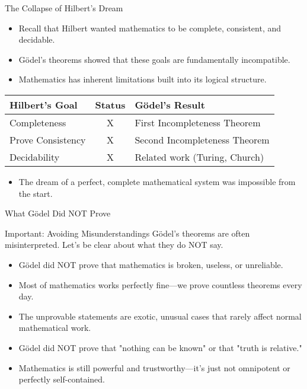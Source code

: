 \documentclass[aspectratio=169]{beamer}
\begin{document}
\begin{frame}{The Collapse of Hilbert's Dream}

\begin{itemize}
    \item Recall that Hilbert wanted mathematics to be complete, consistent, and decidable.
    \item Gödel's theorems showed that these goals are fundamentally incompatible.
    \item Mathematics has inherent limitations built into its logical structure.
\end{itemize}

\begin{table}
\centering
\begin{tabular}{|l|c|l|}
\hline
\textbf{Hilbert's Goal} & \textbf{Status} & \textbf{Gödel's Result} \\
\hline
Completeness & X & First Incompleteness Theorem \\
Prove Consistency & X & Second Incompleteness Theorem \\
Decidability & X & Related work (Turing, Church) \\
\hline
\end{tabular}
\end{table}

\begin{itemize}
    \item The dream of a perfect, complete mathematical system was impossible from the start.
\end{itemize}

\end{frame}

\begin{frame}{What Gödel Did NOT Prove}

\begin{alertblock}{Important: Avoiding Misunderstandings}
Gödel's theorems are often misinterpreted. Let's be clear about what they do NOT say.
\end{alertblock}

\begin{itemize}
    \item Gödel did NOT prove that mathematics is broken, useless, or unreliable.
    \item Most of mathematics works perfectly fine—we prove countless theorems every day.
    \item The unprovable statements are exotic, unusual cases that rarely affect normal mathematical work.
    \item Gödel did NOT prove that "nothing can be known" or that "truth is relative."
    \item Mathematics is still powerful and trustworthy—it's just not omnipotent or perfectly self-contained.
\end{itemize}

\end{frame}
\end{document}
